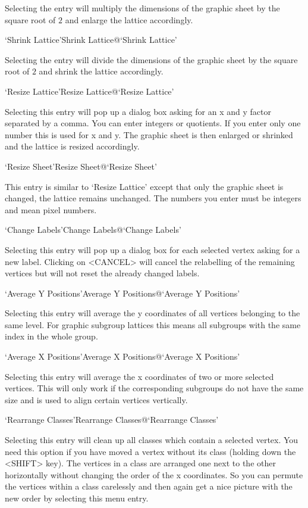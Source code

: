   Selecting the entry will multiply the dimensions of the graphic sheet by
  the square root of $2$ and enlarge the lattice accordingly.

\>`Shrink Lattice'{Shrink Lattice}@{`Shrink Lattice'}

  Selecting  the entry will divide the  dimensions  of the graphic sheet by 
  the square root of $2$ and shrink the lattice accordingly.

\>`Resize Lattice'{Resize Lattice}@{`Resize Lattice'}

Selecting this entry will pop up a dialog box asking for an x and y factor
separated by a comma.  You can enter integers or quotients. If you enter
only one number this is used for x and y.  The graphic sheet is then
enlarged or shrinked and the lattice is resized accordingly.

\>`Resize Sheet'{Resize Sheet}@{`Resize Sheet'}

This  entry is similar to `Resize  Lattice' except that  only the graphic
sheet is changed, the lattice remains unchanged. The numbers you enter must 
be integers and mean pixel numbers.

\>`Change Labels'{Change Labels}@{`Change Labels'}

Selecting  this entry will pop  up a dialog  box for each selected vertex
asking for a new label.  Clicking on <CANCEL>  will cancel the relabelling
of the remaining vertices but will not reset the already changed labels.

\>`Average Y Positions'{Average Y Positions}@{`Average Y Positions'}

Selecting this entry will average the y coordinates of all vertices
belonging to the same level. For graphic subgroup lattices this means all
subgroups with the same index in the whole group.

\>`Average X Positions'{Average X Positions}@{`Average X Positions'}

Selecting this entry  will  average the x   coordinates  of two or   more
selected vertices.  This will only work if the corresponding subgroups do
not have the same size and is used to align certain vertices
vertically.

\>`Rearrange Classes'{Rearrange Classes}@{`Rearrange Classes'}

Selecting this entry will clean up all classes which contain a selected
vertex. You need this option if you have moved a vertex without its class
(holding down the <SHIFT> key). The vertices in a class are arranged one
next to the other horizontally without changing the order of the x
coordinates. So you can permute the vertices within a class carelessly and
then again get a nice picture with the new order by selecting this menu
entry.

